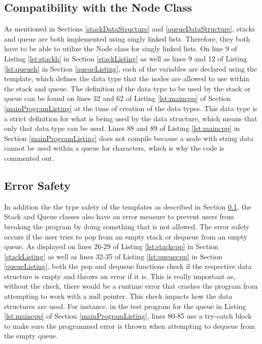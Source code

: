 \documentclass[letterpaper, 10pt,DIV=13]{scrartcl}
\numberwithin{equation}{section} %
\numberwithin{figure}{section} %
\numberwithin{table}{section} %
\begin{document}
\subsection{Compatibility with the Node Class}\label{nodeCompatibility}
As mentioned in Sections \ref{stackDataStructure} and \ref{queueDataStructure}, stacks and queue are both implemented using singly linked lists. Therefore, they both have to be able to utilize the Node class for singly linked lists. On line 9 of Listing \ref{lst:stackh} in Section \ref{stackListing} as well as lines 9 and 12 of Listing \ref{lst:queueh} in Section \ref{queueListing}, each of the variables are declared using the template, which defines the data type that the nodes are allowed to use within the stack and queue. The definition of the data type to be used by the stack or queue can be found on lines 32 and 62 of Listing \ref{lst:maincpp} of Section \ref{mainProgramListing} at the time of creation of the data types. This data type is a strict definition for what is being used by the data structure, which means that only that data type can be used. Lines 88 and 89 of Listing \ref{lst:maincpp} in Section \ref{mainProgramListing} does not compile because a node with string data cannot be used within a queue for characters, which is why the code is commented out.

\subsection{Error Safety}
In addition the the type safety of the templates as described in Section \ref{nodeCompatibility}, the Stack and Queue classes also have an error measure to prevent users from breaking the program by doing something that is not allowed. The error safety occurs if the user tries to pop from an empty stack or dequeue from an empty queue. As displayed on lines 26-29 of Listing \ref{lst:stackcpp} in Section \ref{stackListing} as well as lines 32-35 of Listing \ref{lst:queuecpp} in Section \ref{queueListing}, both the pop and dequeue functions check if the respective data structure is empty and throws an error if it is. This is really important as, without the check, there would be a runtime error that crashes the program from attempting to work with a null pointer. This check impacts how the data structures are used. For instance, in the test program for the queue in Listing \ref{lst:maincpp} of Section \ref{mainProgramListing}, lines 80-85 use a try-catch block to make sure the programmed error is thrown when attempting to dequeue from the empty queue.
\end{document}
